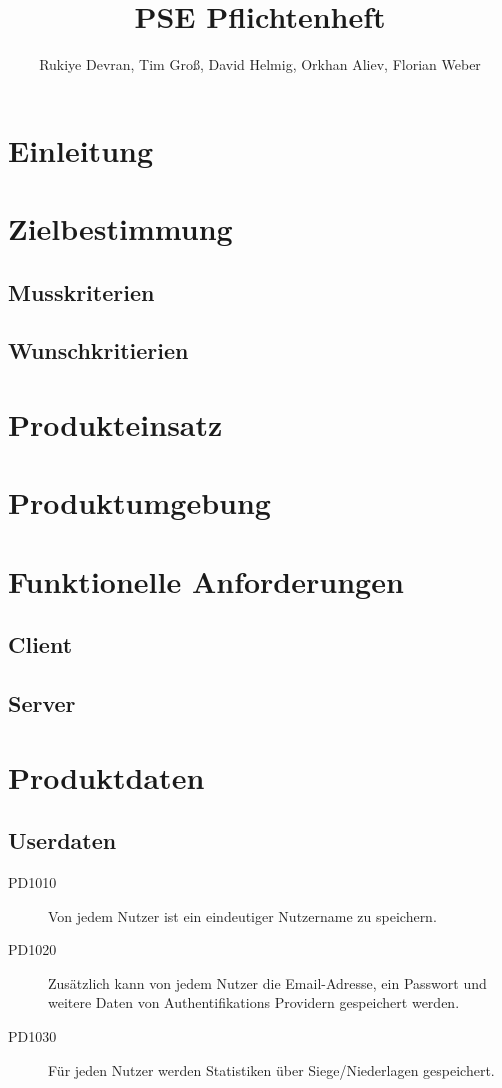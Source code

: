 \documentclass[parskip=full]{scrartcl}
\title{PSE Pflichtenheft}
\author{Rukiye Devran, Tim Groß, David Helmig, Orkhan Aliev, Florian Weber}
\begin{document}
	\begin{titlepage}
	\maketitle	
	\tableofcontents
	
	\end{titlepage}
\section{Einleitung}
\section{Zielbestimmung}
\subsection{Musskriterien}
\subsection{Wunschkritierien}
\section{Produkteinsatz}
\section{Produktumgebung}
\section{Funktionelle Anforderungen}
\subsection{Client}
\subsection{Server}

\section{Produktdaten}

\subsection{Userdaten}
\begin{description}
	
\item[PD1010] Von jedem Nutzer ist ein eindeutiger Nutzername zu speichern.
\item[PD1020] Zusätzlich kann von jedem Nutzer die Email-Adresse, ein Passwort 	und weitere Daten von Authentifikations Providern gespeichert werden.
\item [PD1030] Für jeden Nutzer werden Statistiken über Siege/Niederlagen gespeichert.

\end{description}
\end{document}
